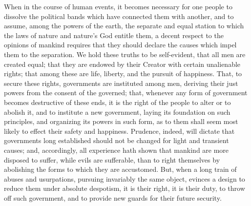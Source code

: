 \documentclass[14pt]{extarticle}
\begin{document}
 When in the course of human events, it becomes necessary for one people to dissolve the political bands which have connected them with another, and to assume, among the powers of the earth, the separate and equal station to which the laws of nature and nature’s God entitle them, a decent respect to the opinions of mankind requires that they should declare the causes which impel them to the separation. We hold these truths to be self-evident, that all men are created equal; that they are endowed by their Creator with certain unalienable rights; that among these are life, liberty, and the pursuit of happiness. That, to secure these rights, governments are instituted among men, deriving their just powers from the consent of the governed; that, whenever any form of government becomes destructive of these ends, it is the right of the people to alter or to abolish it, and to institute a new government, laying its foundation on such principles, and organizing its powers in such form, as to them shall seem most likely to effect their safety and happiness. 
Prudence, indeed, will dictate that governments long established should not be changed for light and transient causes; and, accordingly, all experience hath shown that mankind are more disposed to suffer, while evils are sufferable, than to right themselves by abolishing the forms to which they are accustomed. But, when a long train of abuses and usurpations, pursuing invariably the same object, evinces a design to reduce them under absolute despotism, it is their right, it is their duty, to throw off such government, and to provide new guards for their future security.
\end{document}
